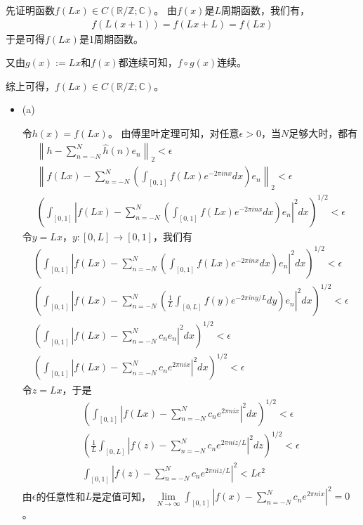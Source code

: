 \documentclass{article}
\begin{document}
先证明函数$f(Lx) \in C(\mathbb{R}/\mathbb{Z}; \mathbb{C})$。
由$f(x)$是$L$周期函数，我们有，
\begin{align*}
  f(L(x+1)) = f(Lx + L) = f(Lx)
\end{align*}
于是可得$f(Lx)$是1周期函数。

又由$g(x) := Lx$和$f(x)$都连续可知，$f \circ g(x)$连续。

综上可得，$f(Lx) \in C(\mathbb{R}/\mathbb{Z}; \mathbb{C})$。

\begin{itemize}
  \item (a)

        令$h(x) = f(Lx)$。
        由傅里叶定理可知，对任意$\epsilon > 0$，当$N$足够大时，都有
        \begin{align*}
          \left\| h - \sum_{n = -N}^{N} \hat{h}(n)e_n \right\|_2 < \epsilon                                 \\
          \left\| f(Lx) - \sum_{n = -N}^{N} (\int_{[0, 1]} f(Lx)e^{-2\pi i nx} dx)e_n \right\|_2 < \epsilon \\
          \left(\int_{[0, 1]} |f(Lx) - \sum_{n = -N}^{N} (\int_{[0, 1]} f(Lx)e^{-2\pi i nx} dx)e_n|^2 dx\right)^{1/2} < \epsilon
        \end{align*}
        令$y = Lx$，$y : [0, L] \to [0, 1]$，我们有
        \begin{align*}
          \left(\int_{[0, 1]} |f(Lx) - \sum_{n = -N}^{N} (\int_{[0, 1]} f(Lx)e^{-2\pi i nx} dx)e_n|^2 dx \right)^{1/2} < \epsilon             \\
          \left(\int_{[0, 1]} |f(Lx) - \sum_{n = -N}^{N} (\frac{1}{L}\int_{[0, L]} f(y)e^{-2\pi i ny/L} dy)e_n|^2 dx \right)^{1/2} < \epsilon \\
          \left(\int_{[0, 1]} |f(Lx) - \sum_{n = -N}^{N} c_n e_n|^2 dx\right)^{1/2} < \epsilon                                                \\
          \left(\int_{[0, 1]} |f(Lx) - \sum_{n = -N}^{N} c_n e^{2\pi n i x}|^2 dx\right)^{1/2} < \epsilon
        \end{align*}
        令$z = Lx$，于是
        \begin{align*}
          \left(\int_{[0, 1]} |f(Lx) - \sum_{n = -N}^{N} c_n e^{2\pi n i x}|^2 dx \right)^{1/2} < \epsilon            \\
          \left(\frac{1}{L}\int_{[0, L]} |f(z) - \sum_{n = -N}^{N} c_n e^{2\pi n i z/L}|^2 dz\right)^{1/2} < \epsilon \\
          \int_{[0, 1]} |f(z) - \sum_{n = -N}^{N} c_n e^{2\pi n i z/L}|^2 < L \epsilon^2
        \end{align*}
        由$\epsilon$的任意性和$L$是定值可知，
        $\lim\limits_{N \to \infty} \int_{[0, 1]} |f(x) - \sum_{n = -N}^{N} c_n e^{2\pi n i x}|^2  = 0$。


\end{itemize}
\end{document}
